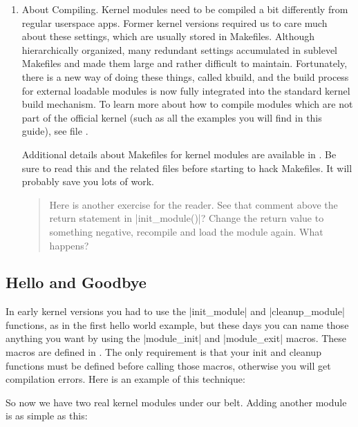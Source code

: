 \documentclass[10pt, oneside]{book}
\begin{document}
\begin{enumerate}
  \item About Compiling.
        Kernel modules need to be compiled a bit differently from regular userspace apps.
        Former kernel versions required us to care much about these settings, which are usually stored in Makefiles.
        Although hierarchically organized, many redundant settings accumulated in sublevel Makefiles and made them large and rather difficult to maintain.
        Fortunately, there is a new way of doing these things, called kbuild, and the build process for external loadable modules is now fully integrated into the standard kernel build mechanism.
        To learn more about how to compile modules which are not part of the official kernel (such as all the examples you will find in this guide), see file .

        Additional details about Makefiles for kernel modules are available in .
        Be sure to read this and the related files before starting to hack Makefiles. It will probably save you lots of work.

\begin{quote}
Here is another exercise for the reader.
See that comment above the return statement in \cpp|init_module()|?
Change the return value to something negative, recompile and load the module again.
What happens?
\end{quote}
\end{enumerate}

\subsection{Hello and Goodbye}
\label{sec:hello_n_goodbye}
In early kernel versions you had to use the \cpp|init_module| and \cpp|cleanup_module| functions, as in the first hello world example,
but these days you can name those anything you want by using the \cpp|module_init| and \cpp|module_exit| macros.
These macros are defined in .
The only requirement is that your init and cleanup functions must be defined before calling those macros, otherwise you will get compilation errors.
Here is an example of this technique:


So now we have two real kernel modules under our belt. Adding another module is as simple as this:

\end{document}

